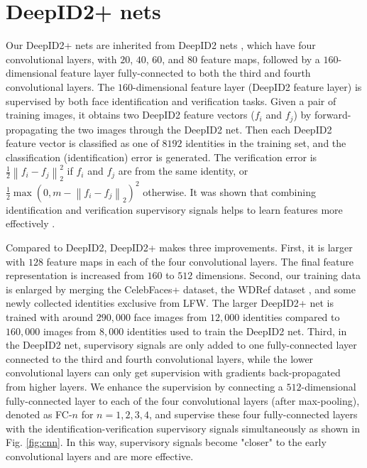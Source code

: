 \documentclass[10pt,twocolumn,letterpaper]{article}
\begin{document}
\section{DeepID2+ nets}

Our DeepID2+ nets are inherited from DeepID2 nets \cite{sun2014b}, which have four convolutional layers, with $20$, $40$, $60$, and $80$  feature maps, followed by a $160$-dimensional feature layer fully-connected to both the third and fourth convolutional layers. The $160$-dimensional feature layer (DeepID2 feature layer) is supervised by both face identification and verification tasks. Given a pair of training  images, it  obtains two DeepID2 feature vectors ($f_i$ and $f_j$) by forward-propagating the two images through the DeepID2 net. Then each DeepID2 feature vector is classified as one of $8192$ identities in the training set, and the classification (identification) error is generated. The verification error is $\frac{1}{2}\left\|f_i-f_j\right\|_2^2$ if $f_i$ and $f_j$ are from the same identity, or $\frac{1}{2}\max\left(0, m - \left\|f_i-f_j\right\|_2\right)^2$ otherwise. It was shown that combining identification and verification supervisory signals helps to learn features more effectively \cite{sun2014b}.

Compared to DeepID2, DeepID2+ makes three improvements. First, it is larger with $128$ feature maps in each of the four convolutional layers. The final feature representation is increased from $160$ to $512$ dimensions. Second, our training data is  enlarged by merging the CelebFaces+ dataset\cite{sun2014a}, the WDRef dataset \cite{chen2012}, and some newly collected identities exclusive from LFW. The larger DeepID2+ net is trained with around $290,000$ face images from $12,000$ identities compared to $160,000$ images from $8,000$ identities used to train the DeepID2 net. Third, in the DeepID2 net, supervisory signals are only added to one fully-connected layer connected to the third and fourth convolutional layers, while the lower convolutional layers can only get supervision with gradients back-propagated from higher layers. We enhance the supervision by connecting a $512$-dimensional fully-connected layer to each of the four convolutional layers (after max-pooling), denoted as FC-$n$ for $n=1,2,3,4$, and supervise these four fully-connected layers with the identification-verification supervisory signals \cite{sun2014b} simultaneously as shown in Fig. \ref{fig:cnn}. In this way, supervisory signals become "closer" to the early convolutional layers and are more effective.
\end{document}
